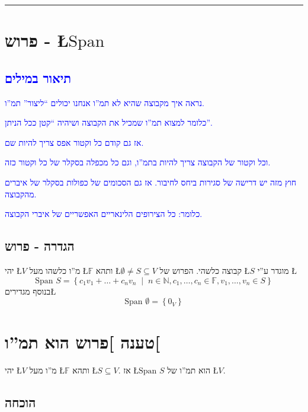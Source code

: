 \documentclass[english,hebrew]{article}
\newcommand{\spn}{\text{Span }}
\begin{document}
\medskip{}

\rule[0.5ex]{1\columnwidth}{1pt}

\medskip{}

\section{פרוש - \L{$\spn$}}

\subsection{\textcolor{blue}{תיאור במילים}}

\textcolor{blue}{נראה איך מקבוצה שהיא לא תמ\textquotedblright ו אנחנו
יכולים \textquotedblleft ליצור\textquotedblright{} תמ\textquotedblright ו.}

\textcolor{blue}{כלומר למצוא תמ\textquotedblright ו שמכיל את הקבוצה
ושיהיה \textquotedblleft קטן ככל הניתן\textquotedblright .}

\textcolor{blue}{אז גם קודם כל וקטור אפס צריך להיות שם.}

\textcolor{blue}{וכל וקטור של הקבוצה צריך להיות בתמ\textquotedblright ו,
וגם כל מכפלה בסקלר של כל וקטור כזה.}

\textcolor{blue}{חוץ מזה יש דרישה של סגירות ביחס לחיבור. אז גם הסכומים
של כפולות בסקלר של איברים מהקבוצה.}

\textcolor{blue}{כלומר: כל הצירופים הלינאריים האפשריים של איברי הקבוצה.}

\subsection{הגדרה - פרוש}

יהי \L{$V$} מ\textquotedblright ו כלשהו מעל \L{$\mathbb{F}$} ותהא
\L{$\emptyset\neq S\subseteq V$} קבוצה כלשהי. הפרוש של \L{$S$} מוגדר
ע\textquotedblright י \L{%
\[
\spn S=\left\{ c_{1}v_{1}+\dots+c_{n}v_{n}\;\middle|\;n\in\mathbb{N},c_{1},\dots,c_{n}\in\mathbb{F},v_{1},\dots,v_{n}\in S\right\} 
\]
}%
בנוסף מגדירים\L{%
\[
\spn\emptyset=\left\{ 0_{V}\right\} 
\]
}%

\section{טענה {]}פרוש הוא תמ\textquotedblright ו{[}}

יהי \L{$V$} מ\textquotedblright ו מעל \L{$\mathbb{F}$} ותהא \L{$S\subseteq V$}.
אז \L{$\spn S$} הוא תמ\textquotedblright ו של \L{$V$}.

\subsection{הוכחה}
\end{document}
